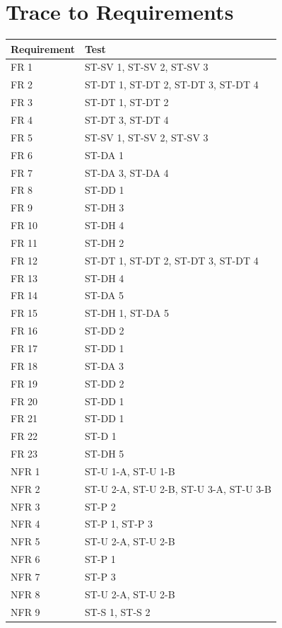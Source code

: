 \documentclass[12pt, titlepage]{article}
\begin{document}
\section{Trace to Requirements}
\begin{tabular}{| p{} | p{}|}
  \hline
  \rowcolor[gray]{0.9}
  Requirement & Test \\
  \hline
  FR 1 & ST-SV 1, ST-SV 2, ST-SV 3 \\
  \hline
  FR 2 & ST-DT 1, ST-DT 2, ST-DT 3, ST-DT 4 \\
  \hline
  FR 3 & ST-DT 1, ST-DT 2 \\
  \hline
  FR 4 & ST-DT 3, ST-DT 4 \\
  \hline
  FR 5 & ST-SV 1, ST-SV 2, ST-SV 3 \\
  \hline
  FR 6 & ST-DA 1 \\
  \hline
  FR 7 & ST-DA 3, ST-DA 4 \\
  \hline
  FR 8 & ST-DD 1 \\
  \hline
  FR 9 & ST-DH 3 \\
  \hline
  FR 10 & ST-DH 4 \\
  \hline
  FR 11 & ST-DH 2 \\
  \hline
  FR 12 & ST-DT 1, ST-DT 2, ST-DT 3, ST-DT 4 \\
  \hline
  FR 13 & ST-DH 4 \\
  \hline
  FR 14 & ST-DA 5 \\
  \hline
  FR 15 & ST-DH 1, ST-DA 5\\
  \hline
  FR 16 & ST-DD 2 \\
  \hline
  FR 17 & ST-DD 1 \\
  \hline
  FR 18 & ST-DA 3 \\
  \hline
  FR 19 & ST-DD 2 \\
  \hline
  FR 20 & ST-DD 1 \\
  \hline
  FR 21 & ST-DD 1 \\
  \hline
  FR 22 & ST-D 1 \\
  \hline
  FR 23 & ST-DH 5 \\
  \hline
  NFR 1 & ST-U 1-A, ST-U 1-B \\
  \hline
  NFR 2 & ST-U 2-A, ST-U 2-B, ST-U 3-A, ST-U 3-B \\
  \hline
  NFR 3 & ST-P 2 \\
  \hline
  NFR 4 & ST-P 1, ST-P 3 \\
  \hline
  NFR 5 & ST-U 2-A, ST-U 2-B \\
  \hline
  NFR 6 & ST-P 1 \\
  \hline
  NFR 7 & ST-P 3 \\
  \hline
  NFR 8 & ST-U 2-A, ST-U 2-B \\
  \hline
  NFR 9 & ST-S 1, ST-S 2 \\
  \hline
\end{tabular}
		
\end{document}
